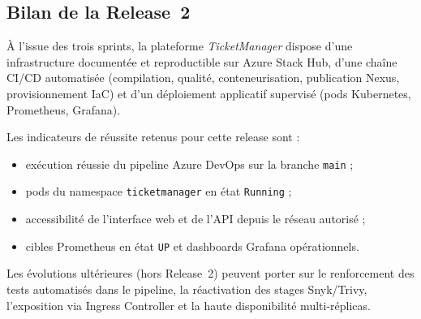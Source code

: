 





\subsection{Bilan de la Release~2}

À l'issue des trois sprints, la plateforme \textit{TicketManager} dispose d'une
infrastructure documentée et reproductible sur Azure Stack Hub, d'une chaîne CI/CD
automatisée (compilation, qualité, conteneurisation, publication Nexus, provisionnement
IaC) et d'un déploiement applicatif supervisé (pods Kubernetes, Prometheus, Grafana).

Les indicateurs de réussite retenus pour cette release sont :
\begin{itemize}
  \item exécution réussie du pipeline Azure DevOps sur la branche \texttt{main} ;
  \item pods du namespace \texttt{ticketmanager} en état \texttt{Running} ;
  \item accessibilité de l'interface web et de l'API depuis le réseau autorisé ;
  \item cibles Prometheus en état \texttt{UP} et dashboards Grafana opérationnels.
\end{itemize}

Les évolutions ultérieures (hors Release~2) peuvent porter sur le renforcement des tests
automatisés dans le pipeline, la réactivation des stages Snyk/Trivy, l'exposition via
Ingress Controller et la haute disponibilité multi-réplicas.
